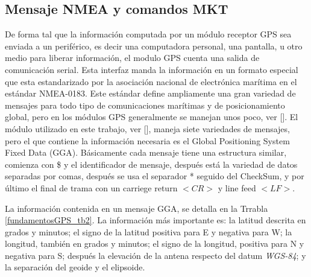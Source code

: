\documentclass[10pt]{report}
\numberwithin{equation}{chapter}
\numberwithin{algorithm}{chapter}
\begin{document}
\subsection{Mensaje NMEA y comandos MKT}%
De forma tal que la información computada por un módulo receptor GPS sea enviada a un periférico, es decir una computadora personal, una pantalla, u otro medio para liberar información, el modulo GPS cuenta una salida de comunicación serial. Esta interfaz manda la información en un formato especial que esta estandarizado por la asociación nacional de electrónica marítima en el estándar NMEA-0183. Este estándar define ampliamente una gran variedad de mensajes para todo tipo de comunicaciones marítimas y de posicionamiento global, pero en los módulos GPS generalmente se manejan unos poco, ver [\cite{SiRF2005}]. El módulo utilizado en este trabajo, ver [\cite{Mediatek2009}], maneja siete variedades de mensajes, pero el que contiene la información necesaria es el Global Positioning System Fixed Data (GGA). Básicamente cada mensaje tiene una estructura similar, comienza con \$ y el identificador de mensaje, después está la variedad de datos separadas por comas, después se usa el separador * seguido del CheckSum, y por último el final de trama con un carriege return $<CR>$ y line feed $<LF>$. \par
La información contenida en un mensaje GGA, se detalla en la Trrabla \ref{fundamentosGPS_tb2}. La información más importante es: la latitud descrita en grados y minutos; el signo de la latitud positiva para E y negativa para W; la longitud, también en grados y minutos; el signo de la longitud, positiva para N y negativa para S; después la elevación de la antena respecto del datum \emph{WGS-84}; y la separación del geoide y el elipsoide.
\end{document}
